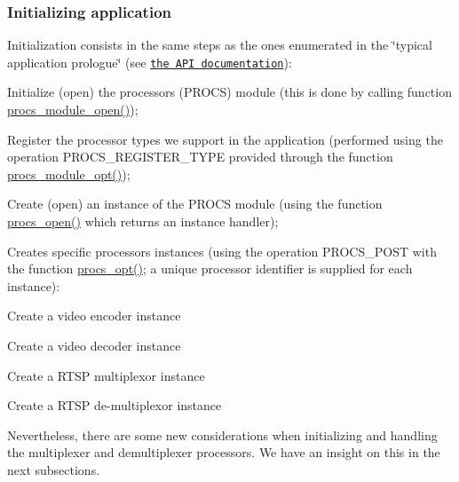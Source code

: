 \subsubsection*{Initializing application}

Initialization consists in the same steps as the ones enumerated in the \char`\"{}typical application prologue\char`\"{} (see \href{md_DOCUMENTATION.html#How_to_use_a_Processor_the_API}{\tt the A\+PI documentation})\+:


\begin{DoxyEnumerate}
\item Initialize (open) the processors (P\+R\+O\+CS) module (this is done by calling function \textquotesingle{}\hyperlink{procs_8c_af5f91a46882b5706b25327384ba347d8}{procs\+\_\+module\+\_\+open()}\textquotesingle{});
\item Register the processor types we support in the application (performed using the operation \textquotesingle{}P\+R\+O\+C\+S\+\_\+\+R\+E\+G\+I\+S\+T\+E\+R\+\_\+\+T\+Y\+PE\textquotesingle{} provided through the function \textquotesingle{}\hyperlink{procs_8c_a226ac6dfd7598a59b9ceab3a92239a80}{procs\+\_\+module\+\_\+opt()}\textquotesingle{});
\item Create (open) an instance of the P\+R\+O\+CS module (using the function \textquotesingle{}\hyperlink{procs_8c_a6fae33560b633113d848f6ec5e8461e5}{procs\+\_\+open()}\textquotesingle{} which returns an instance handler);
\item Creates specific processors instances (using the operation \textquotesingle{}P\+R\+O\+C\+S\+\_\+\+P\+O\+ST\textquotesingle{} with the function \textquotesingle{}\hyperlink{procs_8c_a7af2e6f2788006cfc96ca8d811922ffa}{procs\+\_\+opt()}\textquotesingle{}; a unique processor identifier is supplied for each instance)\+:
\begin{DoxyItemize}
\item Create a video encoder instance
\item Create a video decoder instance
\item Create a R\+T\+SP multiplexor instance
\item Create a R\+T\+SP de-\/multiplexor instance
\end{DoxyItemize}
\end{DoxyEnumerate}

Nevertheless, there are some new considerations when initializing and handling the multiplexer and demultiplexer processors. We have an insight on this in the next subsections.

